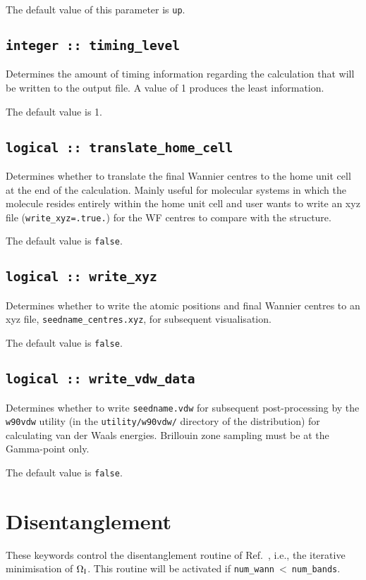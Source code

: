 The default value of this parameter is \verb#up#.


\subsection[timing\_level]{\tt integer :: timing\_level}

Determines the amount of timing information regarding the calculation
that will be written to the output file. A value of 1 produces the
least information. 

The default value is 1.

\subsection[translate\_home\_cell]{\tt logical :: translate\_home\_cell}

Determines whether to translate the final Wannier centres to the home
unit cell at the end of the calculation. Mainly useful for molecular
systems in which the molecule resides entirely within the home unit 
cell and user wants to write an xyz file ({\tt write\_xyz=.true.}) for
the WF centres to compare with the structure. 

The default value is \verb#false#. 

\subsection[write\_xyz]{\tt logical :: write\_xyz}

Determines whether to write the atomic positions and 
final Wannier centres to an xyz file,
\verb#seedname_centres.xyz#, for subsequent
visualisation. 

The default value is \verb#false#.

\subsection[write\_vdw\_data]{\tt logical :: write\_vdw\_data}

Determines whether to write \verb#seedname.vdw# for
subsequent post-processing by the \verb#w90vdw# utility
(in the \verb#utility/w90vdw/# directory of the
distribution) for calculating van der Waals energies.
Brillouin zone sampling must be at the Gamma-point only.

The default value is \verb#false#.


\section{Disentanglement}
These keywords control the disentanglement routine of
Ref.~\cite{souza-prb01}, i.e., the iterative minimisation of $\Omega_{\mathrm{I}}$. This
routine will be activated if \verb#num_wann#$\:<\:$\verb#num_bands#.



